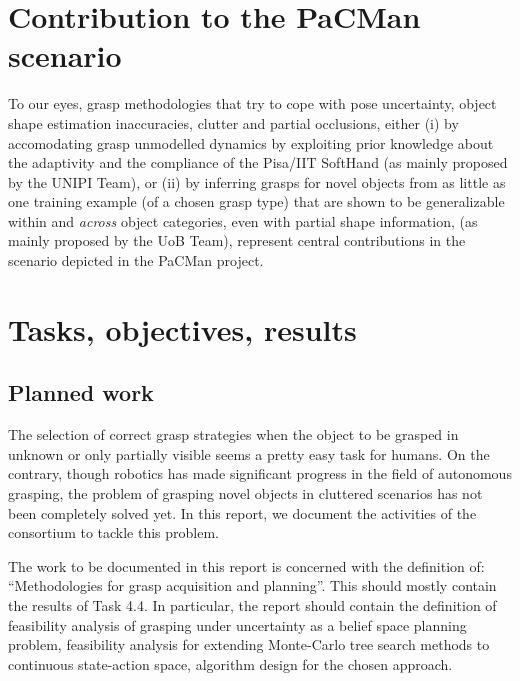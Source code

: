 \documentclass[a4paper,11pt,pdf]{pacmanreport}
\begin{document}
\section*{Contribution to the PaCMan scenario}

To our eyes, grasp methodologies that try to cope with pose uncertainty, object shape estimation inaccuracies, clutter and partial occlusions, either (i) by accomodating grasp unmodelled dynamics by exploiting prior knowledge about the adaptivity and the compliance of the Pisa/IIT SoftHand (as mainly proposed by the UNIPI Team), or (ii) by inferring grasps for novel objects from as little as one training example (of a chosen grasp type) that are shown to be generalizable within and \emph{across} object categories, even with partial shape information, (as mainly proposed by the UoB Team), represent central contributions in the scenario depicted in the PaCMan project.


\newpage

\section{Tasks, objectives, results}

\subsection{Planned work}
The selection of correct grasp strategies when the object to be grasped in unknown or only partially visible seems a pretty easy task for humans.
On the contrary, though robotics has made significant progress in the field of autonomous grasping, the problem of grasping novel objects in cluttered scenarios has not been completely solved yet. In this report, we document the activities of the consortium to tackle this problem.

The work to be documented in this report is concerned with the definition of: ``Methodologies for grasp acquisition and planning''. This should mostly contain the results of Task 4.4. In particular, the report should contain the definition of feasibility analysis of grasping under uncertainty as a belief space planning problem, feasibility analysis for extending Monte-Carlo tree search methods to continuous state-action space, algorithm design for the chosen approach.

\end{document}
